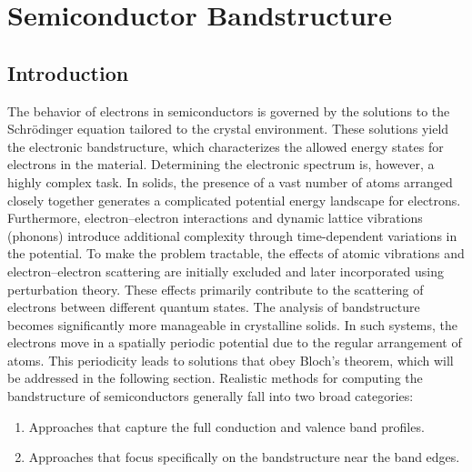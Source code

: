 \chapter{Semiconductor Bandstructure}

\section{Introduction}
The behavior of electrons in semiconductors is governed by the solutions to the Schrödinger equation tailored to the crystal environment. These solutions yield the electronic bandstructure, which characterizes the allowed energy states for electrons in the material. Determining the electronic spectrum is, however, a highly complex task. In solids, the presence of a vast number of atoms arranged closely together generates a complicated potential energy landscape for electrons. Furthermore, electron–electron interactions and dynamic lattice vibrations (phonons) introduce additional complexity through time-dependent variations in the potential.
To make the problem tractable, the effects of atomic vibrations and electron–electron scattering are initially excluded and later incorporated using perturbation theory. These effects primarily contribute to the scattering of electrons between different quantum states.
The analysis of bandstructure becomes significantly more manageable in crystalline solids. In such systems, the electrons move in a spatially periodic potential due to the regular arrangement of atoms. This periodicity leads to solutions that obey Bloch’s theorem, which will be addressed in the following section.
Realistic methods for computing the bandstructure of semiconductors generally fall into two broad categories:
\begin{enumerate}
	\item Approaches that capture the full conduction and valence band profiles.
	\item Approaches that focus specifically on the bandstructure near the band edges.
\end{enumerate}

